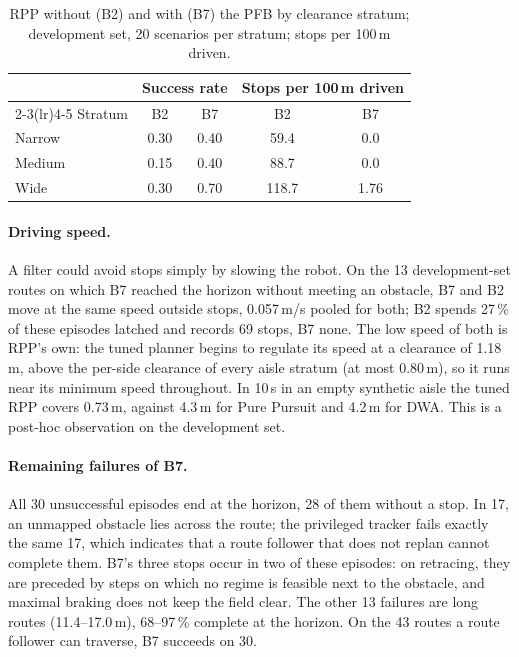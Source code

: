 \documentclass[11pt]{article}
\theoremstyle{definition}
\begin{document}
\begin{table}[!htbp]
\centering
\caption{RPP without (B2) and with (B7) the PFB by clearance stratum; development set, 20 scenarios per
stratum; stops per 100\,m driven.}
\label{tab:strata}
\small
\begin{tabular}{lcccc}
\toprule
& \multicolumn{2}{c}{Success rate} & \multicolumn{2}{c}{Stops per 100\,m driven}\\
\cmidrule(lr){2-3}\cmidrule(lr){4-5}
Stratum & B2 & B7 & B2 & B7\\
\midrule
Narrow & 0.30 & 0.40 & 59.4 & 0.0\\
Medium & 0.15 & 0.40 & 88.7 & 0.0\\
Wide & 0.30 & 0.70 & 118.7 & 1.76\\
\bottomrule
\end{tabular}
\end{table}

\paragraph{Driving speed.} A filter could avoid stops simply by slowing the robot. On the 13 development-set routes on
which B7 reached the horizon without meeting an obstacle, B7 and B2 move at the same speed outside stops,
0.057\,m/s pooled for both; B2 spends 27\,\% of these episodes latched and records 69 stops, B7 none. The
low speed of both is RPP's own: the tuned planner begins to regulate its speed at a clearance of 1.18\,m,
above the per-side clearance of every aisle stratum (at most 0.80\,m), so it runs near its minimum speed throughout. In 10\,s in an empty
synthetic aisle the tuned RPP covers 0.73\,m, against 4.3\,m for Pure Pursuit and 4.2\,m for DWA. This is
a post-hoc observation on the development set.

\paragraph{Remaining failures of B7.} All 30 unsuccessful episodes end at the horizon, 28 of them without a
stop. In 17, an unmapped obstacle lies across the route; the privileged tracker fails exactly the same 17, which indicates that a route follower that does not replan cannot complete them. B7's three stops occur in two of these
episodes: on retracing, they are preceded by steps on which no regime is feasible next to the obstacle,
and maximal braking does not keep the field clear. The other 13 failures are long routes (11.4--17.0\,m),
68--97\,\% complete at the horizon. On the 43 routes a route follower can traverse, B7 succeeds on 30.
\end{document}
